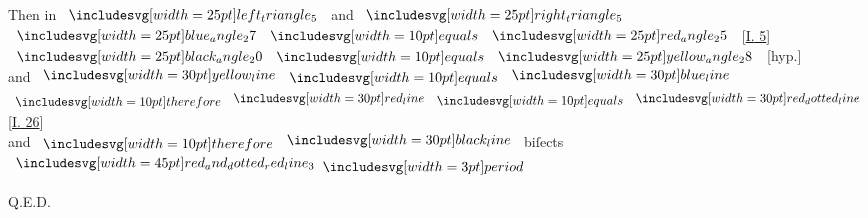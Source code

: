 \documentclass[11pt,preview]{standalone}
\begin{document}
\begin{center}
    Then in $\img{left_triangle_5}$ and $\img{right_triangle_5}$\\
    $\img{blue_angle_27} \bequals \img{red_angle_25}$ [\hyperref[book1pr5]{\textsc{I.} 5}]\\
    $\img{black_angle_20} \bequals \img{yellow_angle_28}$ [hyp.]\\
    and $\yellowline \bequals \blueline$\\
    $\btherefore \redline \bequals \dottedredline$ [\hyperref[book1pr26]{\textsc{I.} 26}]\\
    and $\btherefore \blackline$ biſects $\bimg{red_and_dotted_red_line_3} \bperiod$
\end{center}

\hfill

\hfill Q.E.D.
\end{document}
